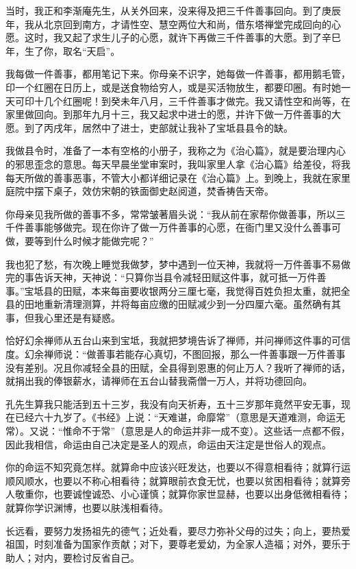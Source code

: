 \documentclass[12pt,UTF8]{ctexbook}
\begin{document}
当时，我正和李渐庵先生，从关外回来，没来得及把三千件善事回向。到了庚辰年，我从北京回到南方，才请性空、慧空两位大和尚，借东塔禅堂完成回向的心愿。这时，我又起了求生儿子的心愿，就许下再做三千件善事的大愿。到了辛巳年，生了你，取名“天启”。

我每做一件善事，都用笔记下来。你母亲不识字，她每做一件善事，都用鹅毛管，印一个红圈在日历上，或是送食物给穷人，或是买活物放生，都要印圈。有时她一天可印十几个红圈呢！到癸未年八月，三千件善事才做完。我又请性空和尚等，在家里做回向。到那年九月十三，我又起求中进士的愿，并许下做一万件善事的大愿。到了丙戌年，居然中了进士，吏部就让我补了宝坻县县令的缺。

我做县令时，准备了一本有空格的小册子，我称之为《治心篇》，就是要治理内心的邪思歪念的意思。每天早晨坐堂审案时，我叫家里人拿《治心篇》给差役，将我每天所做的善事恶事，不管大小都详细记录在《治心篇》上。到晚上，我就在家里庭院中摆下桌子，效仿宋朝的铁面御史赵阅道，焚香祷告天帝。

你母亲见我所做的善事不多，常常皱著眉头说：“我从前在家帮你做善事，所以三千件善事能够做完。现在你许了做一万件善事的心愿，在衙门里又没什么善事可做，要等到什么时候才能做完呢？”

我也犯了愁，有次晚上睡觉我做梦，梦中遇到一位天神，我就将一万件善事不易做完的事告诉天神，天神说：“只算你当县令减轻田赋这件事，就可抵一万件善事。”宝坻县的田赋，本来每亩要收银两分三厘七毫，我觉得百姓负担太重，就把全县的田地重新清理测算，并将每亩应缴的田赋减少到一分四厘六毫。虽然确有其事，但我心里还是有疑惑。

恰好幻余禅师从五台山来到宝坻，我就把梦境告诉了禅师，并问禅师这件事的可信度。幻余禅师说：“做善事若能存心真切，不图回报，那么一件善事跟一万件善事没有差别。况且你减轻全县的田赋，全县得到恩惠的何止万人？我听了禅师的话，就捐出我的俸银薪水，请禅师在五台山替我斋僧一万人，并将功德回向。

孔先生算我只能活到五十三岁，我没有向天祈寿，五十三岁那年竟然平安无事，现在已经六十九岁了。《书经》上说：“天难谌，命靡常”（意思是天道难测，命运无常）。又说：“惟命不于常”（意思是人的命运并非一成不变）。这些话一点都不假，因此我相信，命运由自己决定是圣人的观点，命运由天注定是世俗人的观点。

你的命运不知究竟怎样。就算命中应该兴旺发达，也要以不得意相看待；就算行运顺风顺水，也要以不称心相看待；就算眼前衣食无忧，也要以贫困相看待；就算旁人敬重你，也要诚惶诚恐、小心谨慎；就算你家世显赫，也要以出身低微相看待；就算你学识渊博，也要以肤浅相看待。

长远看，要努力发扬祖先的德气；近处看，要尽力弥补父母的过失；向上，要热爱祖国，时刻准备为国家作贡献；对下，要尊老爱幼，为全家人造福；对外，要乐于助人；对内，要检讨反省自己。
\end{document}
